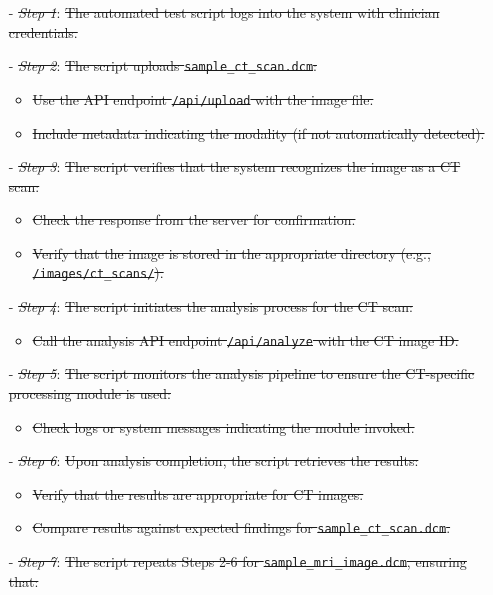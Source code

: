 \documentclass[12pt, titlepage]{article}
\begin{document}
\begin{enumerate}
\begin{itemize}
  \item[-] \textit{\sout{Step 1}}: \sout{The automated test script logs into the system with clinician credentials.}
  \item[-] \textit{\sout{Step 2}}: \sout{The script uploads \texttt{sample\_ct\_scan.dcm}:}
    \begin{itemize}
      \item \sout{Use the API endpoint \texttt{/api/upload} with the image file.}
      \item \sout{Include metadata indicating the modality (if not automatically detected).}
    \end{itemize}
  \item[-] \textit{\sout{Step 3}}: \sout{The script verifies that the system recognizes the image as a CT scan:}
    \begin{itemize}
      \item \sout{Check the response from the server for confirmation.}
      \item \sout{Verify that the image is stored in the appropriate directory (e.g., \texttt{/images/ct\_scans/}).}
    \end{itemize}
  \item[-] \textit{\sout{Step 4}}: \sout{The script initiates the analysis process for the CT scan:}
    \begin{itemize}
      \item \sout{Call the analysis API endpoint \texttt{/api/analyze} with the CT image ID.}
    \end{itemize}
  \item[-] \textit{\sout{Step 5}}: \sout{The script monitors the analysis pipeline to ensure the CT-specific processing module is used:}
    \begin{itemize}
      \item \sout{Check logs or system messages indicating the module invoked.}
    \end{itemize}
  \item[-] \textit{\sout{Step 6}}: \sout{Upon analysis completion, the script retrieves the results:}
    \begin{itemize}
      \item \sout{Verify that the results are appropriate for CT images.}
      \item \sout{Compare results against expected findings for \texttt{sample\_ct\_scan.dcm}.}
    \end{itemize}
  \item[-] \textit{\sout{Step 7}}: \sout{The script repeats Steps 2-6 for \texttt{sample\_mri\_image.dcm}, ensuring that:}

\end{itemize}
\end{enumerate}
\end{document}
